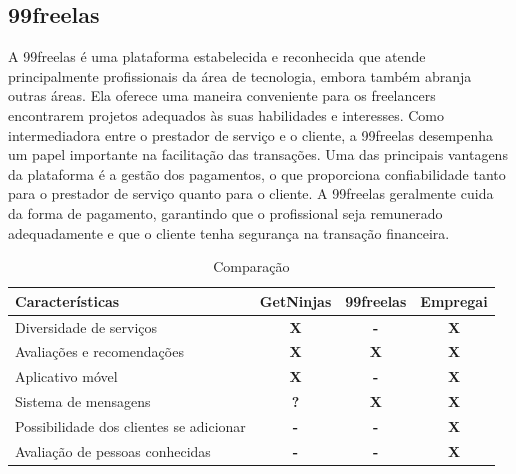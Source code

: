 \subsection{99freelas}
A 99freelas é uma plataforma estabelecida e reconhecida que atende principalmente profissionais da área de tecnologia, embora também abranja
outras áreas. Ela oferece uma maneira conveniente para os freelancers encontrarem projetos adequados às suas habilidades e interesses.
Como intermediadora entre o prestador de serviço e o cliente, a 99freelas desempenha um papel importante na facilitação das transações.
Uma das principais vantagens da plataforma é a gestão dos pagamentos, o que proporciona confiabilidade tanto para o prestador de serviço 
quanto para o cliente. A 99freelas geralmente cuida da forma de pagamento, garantindo que o profissional seja remunerado adequadamente e 
que o cliente tenha segurança na transação financeira.

\begin{table}[htb]
    \centering
    \caption{Comparação}
    \label{tab:comparação}
\begin{tabular}{|p{5cm}|p{2cm}|p{2cm}|p{2cm}|}
    \hline
    \textbf{Características} & \textbf{GetNinjas} & \textbf{99freelas} & \textbf{Empregai}  \\ \hline
    Diversidade de serviços   & \multicolumn{1}{c|}{\textbf{X}}   & \multicolumn{1}{c|}{\textbf{-}}  & \multicolumn{1}{c|}{\textbf{X}} \\ \hline
	Avaliações e recomendações   & \multicolumn{1}{c|}{\textbf{X}}   & \multicolumn{1}{c|}{\textbf{X}}  & \multicolumn{1}{c|}{\textbf{X}} \\ \hline
    Aplicativo móvel   & \multicolumn{1}{c|}{\textbf{X}}   & \multicolumn{1}{c|}{\textbf{-}}  & \multicolumn{1}{c|}{\textbf{X}} \\ \hline
    Sistema de mensagens   & \multicolumn{1}{c|}{\textbf{?}}   & \multicolumn{1}{c|}{\textbf{X}}  & \multicolumn{1}{c|}{\textbf{X }} \\ \hline
    Possibilidade dos clientes se adicionar   & \multicolumn{1}{c|}{\textbf{-}}   & \multicolumn{1}{c|}{\textbf{-}}  & \multicolumn{1}{c|}{\textbf{X}} \\ \hline
	Avaliação de pessoas conhecidas   & \multicolumn{1}{c|}{\textbf{-}}   & \multicolumn{1}{c|}{\textbf{-}}  & \multicolumn{1}{c|}{\textbf{X}} \\ \hline
\end{tabular}
\end{table}

